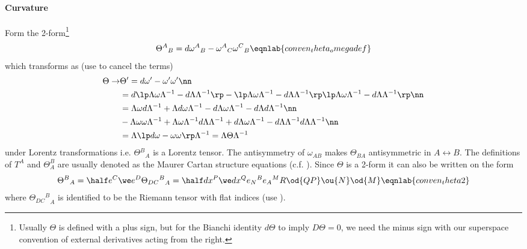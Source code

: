 \paragraph{Curvature}
Form the 2-form\footnote{Usually $\Theta$ is defined with a plus sign, but for the Bianchi identity $d\Theta$ to imply $D\Theta = 0$, we need the minus sign with our superspace convention of external derivatives acting from the right.}
\begin{align}
\Theta{^A}_{B} = d\omega{^A}_B-\omega{^A}_C\omega{^C}_B
\eqnlab{conven_theta_omegadef}
\end{align}
which transforms as (use  to cancel the terms)
\begin{align} 
\Theta\rightarrow&\Theta' =  d\omega'-\omega'\omega'\nn\\
& =  d\lp \Lambda\omega\Lambda^{-1} - d\Lambda\Lambda^{-1}\rp - \lp \Lambda\omega\Lambda^{-1} - d\Lambda\Lambda^{-1}\rp\lp \Lambda\omega\Lambda^{-1} - d\Lambda\Lambda^{-1}\rp\nn\\
& = \Lambda\omega d\Lambda^{-1} + \Lambda d\omega\Lambda^{-1} -  d\Lambda\omega\Lambda^{-1} - d\Lambda d \Lambda^{-1}\nn\\ 
& - \Lambda\omega\omega\Lambda^{-1} + \Lambda\omega\Lambda^{-1}d \Lambda\Lambda^{-1} + d\Lambda\omega\Lambda^{-1} - d\Lambda \Lambda^{-1}d\Lambda \Lambda^{-1}\nn\\
& = \Lambda\lp  d\omega - \omega\omega \rp\Lambda^{-1} = \Lambda \Theta \Lambda^{-1} 
\end{align} 
under Lorentz transformations i.e. $\Theta{^B}_A$ is a Lorentz tensor.
The antisymmetry of $\omega_{AB}$ makes $\Theta_{BA}$ antisymmetric in $A\leftrightarrow B$.
The definitions of $T^A$  and $\Theta^B_A$  are usually denoted as the Maurer Cartan structure equations (c.f. ).
Since $\Theta$ is a 2-form it can also be written on the form
\begin{align}
\Theta{^B}_A = \half  e^C\we e^D \Theta{{_{DC}}^B}_A = \half dx^P\we dx^Q e{_N}^Be{_A}^M R\od{QP}\ou{N}\od{M}
\eqnlab{conven_theta2}
\end{align} 
where $\Theta{{_{DC}}^B}_A$ is identified to be the Riemann tensor with flat indices (use ). 

